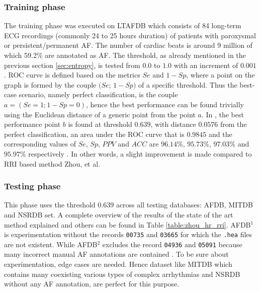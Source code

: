 \subsubsection{Training phase}
The training phase was executed on LTAFDB which consists of 84 long-term ECG recordings (commonly 24 to 25 hours duration) of patients with paroxysmal or persistent/permanent AF. The number of cardiac beats is around 9 million of which 59.2\% are annotated as AF. The threshold, as already mentioned in the previous section \ref{sec:entropy}, is tested from $0.0$ to $1.0$  with an increment of $0.001$. ROC curve is defined based on the metrics $Se$ and $1-Sp$, where a point on the graph is formed by the couple $(Se$; $1-Sp)$ of a specific threshold. Thus the best-case scenario, namely perfect classification, is the couple $a=(Se=1; 1-Sp=0)$, hence the best performance can be found trivially using the Euclidean distance of a generic point from the point $a$. In , the best performance point $b$ is found at threshold $0.639$, with distance $0.0576$ from the perfect classification, an area under the ROC curve that is $0.9845$ and the corresponding values of $Se$, $Sp$, $PPV$ and $ACC$ are $96.14\%$, $95.73\%$, $97.03\%$ and $95.97\%$ respectively \cite{zhou2015}. In other words, a slight improvement is made compared to RRI based method Zhou, et al\cite{zhou2014}.


\subsubsection{Testing phase}
This phase uses the threshold $0.639$ across all testing databases: AFDB, MITDB\cite{mitdb} and NSRDB\cite{nsrdb} set. A complete overview of the results of the state of the art method explained and others can be found in Table \ref{table:zhou_hr_rri}.
AFDB$^1$ is experimentation without the records \verb|00735| and \verb|03665| for which the \verb|.hea| files are not existent. While AFDB$^2$ excludes the record \verb|04936| and \verb|05091| because many incorrect manual AF annotations are contained \cite{lee2013}. 
To be sure about experimentation, edge cases are needed. Hence dataset like MITDB which contains many coexisting various types of complex arrhythmias and NSRDB without any AF annotation, are perfect for this purpose.

